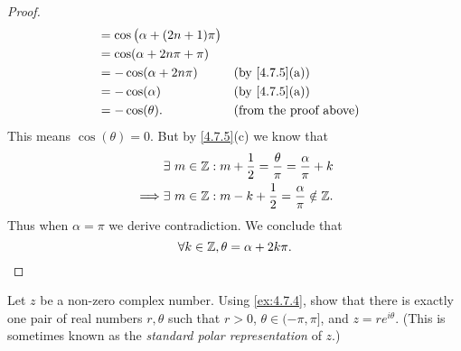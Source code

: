 \begin{proof}
\begin{align*}
                 & = \cos\big(\alpha + (2n + 1) \pi\big)                                    \\
                 & = \cos(\alpha + 2 n \pi + \pi)                                           \\
                 & = -\cos(\alpha + 2 n \pi)             &  & \text{(by \cref{4.7.5}(a))}   \\
                 & = -\cos(\alpha)                       &  & \text{(by \cref{4.7.5}(a))}   \\
                 & = -\cos(\theta).                      &  & \text{(from the proof above)}
  \end{align*}
  This means \(\cos(\theta) = 0\).
  But by \cref{4.7.5}(c) we know that
  \begin{align*}
             & \exists\ m \in \mathbb{Z} : m + \dfrac{1}{2} = \dfrac{\theta}{\pi} = \dfrac{\alpha}{\pi} + k \\
    \implies & \exists\ m \in \mathbb{Z} : m - k + \dfrac{1}{2} = \dfrac{\alpha}{\pi} \notin \mathbb{Z}.
  \end{align*}
  Thus when \(\alpha = \pi\) we derive contradiction.
  We conclude that
  \[
    \forall k \in \mathbb{Z}, \theta = \alpha + 2 k \pi.
  \]
\end{proof}

\begin{ex}\label{ex:4.7.6}
  Let \(z\) be a non-zero complex number.
  Using \cref{ex:4.7.4}, show that there is exactly one pair of real numbers \(r, \theta\) such that \(r > 0\), \(\theta \in (-\pi, \pi]\), and \(z = r e^{i \theta}\).
  (This is sometimes known as the \emph{standard polar representation} of \(z\).)
\end{ex}


